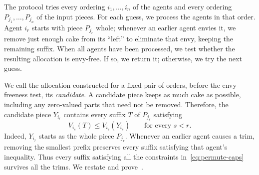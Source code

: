 \documentclass[11pt]{article}
\newcommand{\Permute}{\textsc{Permute}}
\theoremstyle{plain}
\theoremstyle{definition}
\theoremstyle{plain}
\begin{document}
The protocol tries every ordering $i_1,\dots,i_n$ of the agents and every ordering $P_{j_1},\dots,P_{j_n}$ of the input pieces. For each guess, we process the agents in that order. Agent $i_r$ starts with piece $P_{j_r}$ whole; whenever an earlier agent envies it, we remove just enough cake from its ``left'' to eliminate that envy, keeping the remaining suffix. When all agents have been processed, we test whether the resulting allocation is envy-free. If so, we return it; otherwise, we try the next guess. 

\begin{algorithm}[H]
\caption{$\Permute(N,(P_i)_{i \in N})$, where $n=|N|$}\label{alg:permute}
\end{algorithm}

We call the allocation constructed for a fixed pair of orders, before the envy-freeness test, its \emph{candidate}. A candidate piece keeps as much cake as possible, including any zero-valued parts that need not be removed. Therefore, the candidate piece $Y_{i_r}$ contains every suffix $T$ of $P_{j_r}$ satisfying
\begin{equation}\label{eq:permute-caps}
V_{i_s}(T)\le V_{i_s}(Y_{i_s})
\qquad\text{for every }s<r.
\end{equation}
Indeed, $Y_{i_r}$ starts as the whole piece $P_{j_r}$. Whenever an earlier agent causes a trim, removing the smallest prefix preserves every suffix satisfying that agent's inequality. Thus every suffix satisfying all the constraints in~\eqref{eq:permute-caps} survives all the trims. We restate and prove~.

\permutelemma*
\end{document}
